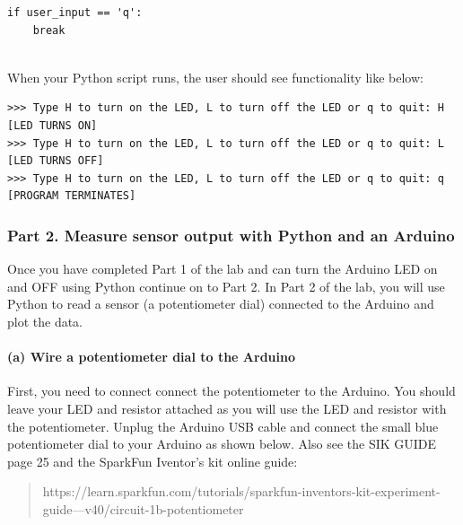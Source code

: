 \documentclass[11pt]{article}
\begin{document}
\begin{verbatim}
if user_input == 'q':
    break
    
\end{verbatim}

When your Python script runs, the user should see functionality like
below:

\begin{verbatim}
>>> Type H to turn on the LED, L to turn off the LED or q to quit: H
[LED TURNS ON]
>>> Type H to turn on the LED, L to turn off the LED or q to quit: L
[LED TURNS OFF]
>>> Type H to turn on the LED, L to turn off the LED or q to quit: q
[PROGRAM TERMINATES]
\end{verbatim}

\newpage

    \hypertarget{part-2.-measure-sensor-output-with-python-and-an-arduino}{%
\subsubsection{Part 2. Measure sensor output with Python and an
Arduino}\label{part-2.-measure-sensor-output-with-python-and-an-arduino}}

Once you have completed Part 1 of the lab and can turn the Arduino LED
on and OFF using Python continue on to Part 2. In Part 2 of the lab, you
will use Python to read a sensor (a potentiometer dial) connected to the
Arduino and plot the data.

    \hypertarget{a-wire-a-potentiometer-dial-to-the-arduino}{%
\paragraph{(a) Wire a potentiometer dial to the
Arduino}\label{a-wire-a-potentiometer-dial-to-the-arduino}}

First, you need to connect connect the potentiometer to the Arduino. You
should leave your LED and resistor attached as you will use the LED and
resistor with the potentiometer. Unplug the Arduino USB cable and
connect the small blue potentiometer dial to your Arduino as shown
below. Also see the SIK GUIDE page 25 and the SparkFun Iventor's kit
online guide:

\begin{quote}
https://learn.sparkfun.com/tutorials/sparkfun-inventors-kit-experiment-guide---v40/circuit-1b-potentiometer

\end{quote}
\end{document}
